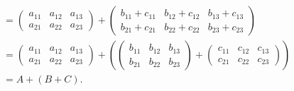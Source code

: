 \begin{exemplo}
\begin{enumerate}[label={\arabic*})]
\begin{solucao}
\begin{itemize}
\begin{align*}
                  \\ &= \begin{pmatrix} a_{11} & a_{12} & a_{13}\\a_{21} & a_{22} & a_{23}\end{pmatrix} + \begin{pmatrix} b_{11} + c_{11} & b_{12} + c_{12} & b_{13} + c_{13}\\b_{21} + c_{21} & b_{22} + c_{22} & b_{23} + c_{23}\end{pmatrix}
                  \\ &= \begin{pmatrix} a_{11} & a_{12} & a_{13}\\a_{21} & a_{22} & a_{23}\end{pmatrix} +
                  \left(\begin{pmatrix} b_{11} & b_{12} & b_{13}\\b_{21} & b_{22} & b_{23}\end{pmatrix} +
                  \begin{pmatrix} c_{11} & c_{12} & c_{13}\\c_{21} & c_{22} & c_{23}\end{pmatrix}\right)
                  \\ &= A + (B + C).
                \end{align*}


\end{itemize}
\end{solucao}
\end{enumerate}
\end{exemplo}
